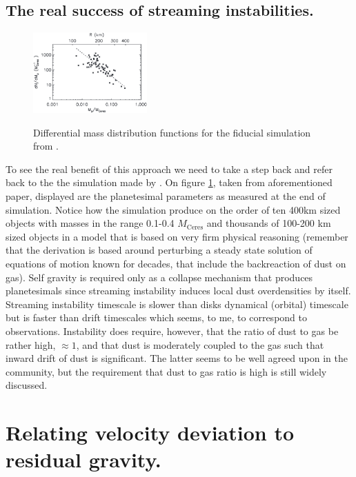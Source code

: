 \documentclass[12pt]{article}
\begin{document}
\subsection{The real success of streaming instabilities.}
\begin{figure}
  \begin{center}
    \label{fig:massradius}
    \includegraphics[width=0.39\textwidth]{images/diffmass.png}
  \end{center}
  \caption{Differential mass distribution functions for the fiducial simulation from \cite{Simon16}.}
\end{figure}

To see the real benefit of this approach we need to take a step back and refer back to the the simulation made by \cite{Simon16}. On figure \ref{fig:massradius}, taken from aforementioned paper, displayed are the planetesimal parameters as measured at the end of simulation. Notice how the simulation produce on the order of ten 400km sized objects with masses in the range 0.1-0.4 $M_\mathrm{Ceres}$ and thousands of 100-200 km sized objects in a model that is based on very firm physical reasoning
\noindent (remember that the derivation is based around perturbing a steady state solution of equations of motion known for decades, that include the backreaction of dust on gas). Self gravity is required only as a collapse mechanism that produces planetesimals since streaming instability induces local dust overdensities by itself. Streaming instability timescale is slower than disks dynamical (orbital) timescale but is faster than drift timescales which seems, to me, to correspond to observations. Instability does require, however, that the ratio of dust to gas be rather high, $\approx 1$, and that dust is moderately coupled to the gas such that inward drift of dust is significant. The latter seems to be well agreed upon in the community, but the requirement that dust to gas ratio is high is still widely discussed.


\newpage
\appendix

\section{Relating velocity deviation to residual gravity.}
\label{appendix:A}
\end{document}
